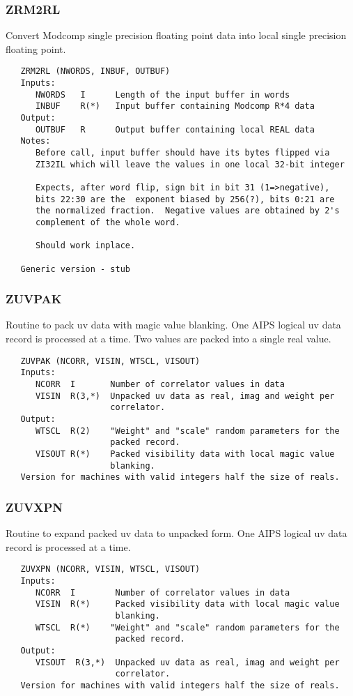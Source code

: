 \subsubsection{ZRM2RL}
Convert Modcomp single precision floating point data into local
single precision floating point.
\begin{verbatim}
   ZRM2RL (NWORDS, INBUF, OUTBUF)
   Inputs:
      NWORDS   I      Length of the input buffer in words
      INBUF    R(*)   Input buffer containing Modcomp R*4 data
   Output:
      OUTBUF   R      Output buffer containing local REAL data
   Notes:
      Before call, input buffer should have its bytes flipped via
      ZI32IL which will leave the values in one local 32-bit integer

      Expects, after word flip, sign bit in bit 31 (1=>negative),
      bits 22:30 are the  exponent biased by 256(?), bits 0:21 are
      the normalized fraction.  Negative values are obtained by 2's
      complement of the whole word.

      Should work inplace.

   Generic version - stub
\end{verbatim}

\subsubsection{ZUVPAK}
Routine to pack uv data with magic value blanking.  One AIPS
logical uv data record is processed at a time.  Two values are packed
into a single real value.
\begin{verbatim}
   ZUVPAK (NCORR, VISIN, WTSCL, VISOUT)
   Inputs:
      NCORR  I       Number of correlator values in data
      VISIN  R(3,*)  Unpacked uv data as real, imag and weight per
                     correlator.
   Output:
      WTSCL  R(2)    "Weight" and "scale" random parameters for the
                     packed record.
      VISOUT R(*)    Packed visibility data with local magic value
                     blanking.
   Version for machines with valid integers half the size of reals.
\end{verbatim}

\subsubsection{ZUVXPN}
Routine to expand packed uv data to unpacked form.  One AIPS
logical uv data record is processed at a time.
\begin{verbatim}
   ZUVXPN (NCORR, VISIN, WTSCL, VISOUT)
   Inputs:
      NCORR  I        Number of correlator values in data
      VISIN  R(*)     Packed visibility data with local magic value
                      blanking.
      WTSCL  R(*)    "Weight" and "scale" random parameters for the
                      packed record.
   Output:
      VISOUT  R(3,*)  Unpacked uv data as real, imag and weight per
                      correlator.
   Version for machines with valid integers half the size of reals.
\end{verbatim}

